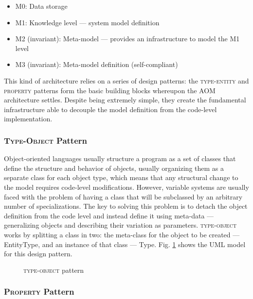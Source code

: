 \begin{itemize}
  \item M0: Data storage
  \item M1: Knowledge level --- system model definition
  \item M2 (invariant): Meta-model --- provides an infrastructure to model the M1 level
  \item M3 (invariant): Meta-model definition (self-compliant)
\end{itemize}

This kind of architecture relies on a series of design patterns: the \textsc{type-entity} and \textsc{property} patterns form the basic building blocks whereupon the AOM architecture settles. Despite being extremely simple, they create the fundamental infrastructure able to decouple the model definition from the code-level implementation.

\subsubsection{\textsc{Type-Object} Pattern}\label{sec:type-entity_pattern}

Object-oriented languages usually structure a program as a set of classes that define the structure and behavior of objects, usually organizing them as a separate class for each object type, which means that any structural change to the model requires code-level modifications. However, variable systems are usually faced with the problem of having a class that will be subclassed by an arbitrary number of specializations. The key to solving this problem is to detach the object definition from the code level and instead define it using meta-data --- generalizing objects and describing their variation as parameters. \textsc{type-object} works by splitting a class in two: the meta-class for the object to be created --- EntityType, and an instance of that class --- Type. Fig. \ref{fig:type-object_pattern} shows the UML model for this design pattern.

\begin{figure}[H]
  \centering
  \caption{\textsc{type-object} pattern}
  \label{fig:type-object_pattern}
\end{figure}

\subsubsection{\textsc{Property} Pattern}\label{sec:property_pattern}

